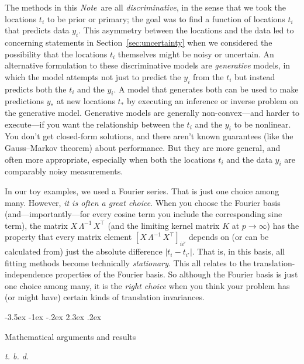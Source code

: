 \documentclass[12pt,letterpaper]{article}
\makeatletter
\renewcommand\section{\@startsection {section}{1}{\z@}%
  {-3.5ex \@plus -1ex \@minus -.2ex}%
  {2.3ex \@plus.2ex}%
  {\raggedright\normalfont\Large\bfseries}}
\newcommand{\documentname}{\textsl{Note}}
\newcommand{\sectionname}{Section}
\makeatother
\begin{document}
The methods in this \documentname\ are all \emph{discriminative}, in the sense that we took the locations $t_i$ to be prior or primary;
the goal was to find a function of locations $t_i$ that predicts data $y_i$.
This asymmetry between the locations and the data led to concerning statements in \sectionname~\ref{sec:uncertainty} when we considered the possibility that the locations $t_i$ themselves might be noisy or uncertain.
An alternative formulation to these discriminative models are \emph{generative} models, in which the model attempts not just to predict the $y_i$ from the $t_i$ but instead predicts both the $t_i$ and the $y_i$.
A model that generates both can be used to make predictions $y_\ast$ at new locations $t_\ast$ by executing an inference or inverse problem on the generative model.
Generative models are generally non-convex---and harder to execute---if you want the relationship between the $t_i$ and the $y_i$ to be nonlinear.
You don't get closed-form solutions, and there aren't known guarantees (like the Gauss--Markov theorem) about performance.
But they are more general, and often more appropriate, especially when both the locations $t_i$ and the data $y_i$ are comparably noisy measurements.

In our toy examples, we used a Fourier series.
That is just one choice among many.
However, \emph{it is often a great choice}.
When you choose the Fourier basis (and---importantly---for every cosine term you include the corresponding sine term), the matrix $X\,\Lambda^{-1}\,X^\top$ (and the limiting kernel matrix $K$ at $p\rightarrow\infty$) has the property that every matrix element $[X\,\Lambda^{-1}\,X^\top]_{ii'}$ depends on (or can be calculated from) just the absolute difference $|t_i-t_{i'}|$.
That is, in this basis, all fitting methods become technically \emph{stationary}.
This all relates to the translation-independence properties of the Fourier basis.
So although the Fourier basis is just one choice among many, it is the \emph{right choice} when you think your problem has (or might have) certain kinds of translation invariances.


{\raggedright


}

\appendix
\section{Mathematical arguments and results}\label{app:math}

\textsl{t. b. d.}
\end{document}
